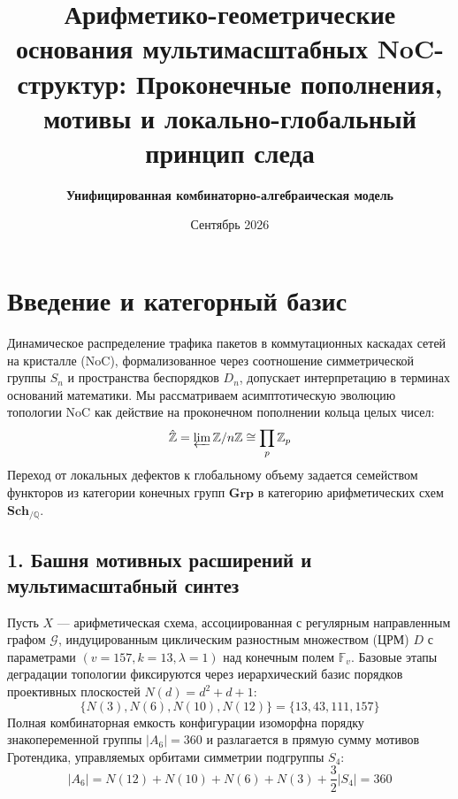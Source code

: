 \documentclass[10pt,twocolumn]{article}
\begin{document}
\title{\textbf{Арифметико-геометрические основания мультимасштабных NoC-структур: Проконечные пополнения, мотивы и локально-глобальный принцип следа}}
\author{\textbf{Унифицированная комбинаторно-алгебраическая модель}}
\date{Сентябрь 2026}
\maketitle

\section*{Введение и категорный базис}
Динамическое распределение трафика пакетов в коммутационных каскадах сетей на кристалле (NoC), формализованное через соотношение симметрической группы $S_n$ и пространства беспорядков $D_n$, допускает интерпретацию в терминах оснований математики. Мы рассматриваем асимптотическую эволюцию топологии NoC как действие на проконечном пополнении кольца целых чисел:
\begin{equation}
\hat{\mathbb{Z}} = \varprojlim \mathbb{Z}/n\mathbb{Z} \cong \prod_{p} \mathbb{Z}_p
\end{equation}
Переход от локальных дефектов к глобальному объему задается семейством функторов из категории конечных групп $\mathbf{Grp}$ в категорию арифметических схем $\mathbf{Sch}_{/\mathbb{Q}}$.

\subsection*{1. Башня мотивных расширений и мультимасштабный синтез}
Пусть $X$ — арифметическая схема, ассоциированная с регулярным направленным графом $\mathcal{G}$, индуцированным циклическим разностным множеством (ЦРМ) $D$ с параметрами $(v=157, k=13, \lambda=1)$ над конечным полем $\mathbb{F}_v$. Базовые этапы деградации топологии фиксируются через иерархический базис порядков проективных плоскостей $N(d) = d^2 + d + 1$:
\begin{equation}
\{N(3), N(6), N(10), N(12)\} = \{13, 43, 111, 157\}
\end{equation}
Полная комбинаторная емкость конфигурации изоморфна порядку знакопеременной группы $\vert A_6 \vert = 360$ и разлагается в прямую сумму мотивов Гротендика, управляемых орбитами симметрии подгруппы $S_4$:
\begin{equation}
\vert A_6 \vert = N(12) + N(10) + N(6) + N(3) + \frac{3}{2}\vert S_4 \vert = 360
\end{equation}
\end{document}
